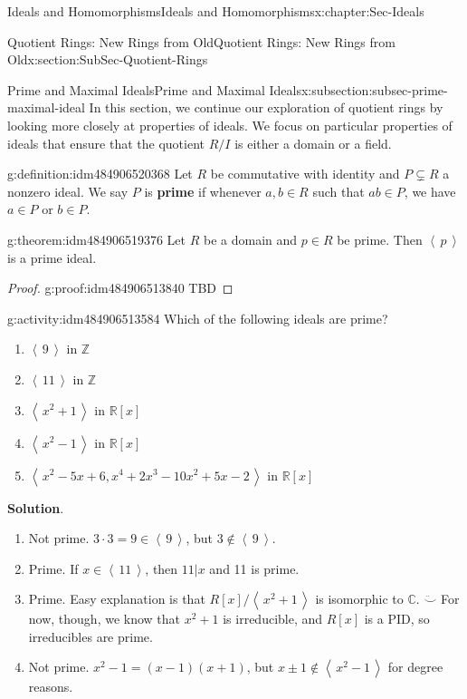 \documentclass[oneside,10pt,]{book}
\newcommand{\blocktitlefont}{\relax}
\newcommand{\terminology}[1]{\textbf{#1}}
\numberwithin{equation}{section}
\newcommand{\ideal}[1]{\left\langle\, #1 \,\right\rangle}
\def\C{{\mathbb C}}
\def\Z{{\mathbb Z}}
\def\R{{\mathbb R}}
\begin{document}
\begin{chapterptx}{Ideals and Homomorphisms}{}{Ideals and Homomorphisms}{}{}{x:chapter:Sec-Ideals}
\begin{sectionptx}{Quotient Rings: New Rings from Old}{}{Quotient Rings: New Rings from Old}{}{}{x:section:SubSec-Quotient-Rings}
\typeout{************************************************}
%
\begin{subsectionptx}{Prime and Maximal Ideals}{}{Prime and Maximal Ideals}{}{}{x:subsection:subsec-prime-maximal-ideal}
In this section, we continue our exploration of quotient rings by looking more closely at properties of ideals. We focus on particular properties of ideals that ensure that the quotient \(R/I\) is either a domain or a field.%
\begin{definition}{}{g:definition:idm484906520368}%
%
%
Let \(R\) be commutative with identity and \(P\subsetneq R\) a nonzero ideal. We say \(P\) is \terminology{prime} if whenever \(a,b\in R\) such that \(ab\in P\), we have \(a\in P\) or \(b\in P\).%
\end{definition}
\begin{theorem}{}{}{g:theorem:idm484906519376}%
Let \(R\) be a domain and \(p\in R\) be prime. Then \(\ideal{p}\) is a prime ideal.%
\end{theorem}
\begin{proof}{}{g:proof:idm484906513840}
TBD\end{proof}
\begin{activity}{}{g:activity:idm484906513584}%
Which of the following ideals are prime?%
\begin{enumerate}
\item{}\(\ideal{9}\) in \(\Z\)%
\item{}\(\ideal{11}\) in \(\Z\)%
\item{}\(\ideal{x^2+1}\) in \(\R[x]\)%
\item{}\(\ideal{x^2-1}\) in \(\R[x]\)%
\item{}\(\ideal{x^2-5x+6, x^4+2x^3-10x^2+5x-2}\) in \(\R[x]\)%
\end{enumerate}
%
\par\smallskip%
\noindent\textbf{\blocktitlefont Solution}.\hypertarget{g:solution:idm484906480592}{}\quad{}%
\begin{enumerate}
\item{}Not prime. \(3\cdot 3= 9\in \ideal{9}\), but \(3\notin\ideal{9}\).%
\item{}Prime. If \(x\in \ideal{11}\), then \(11|x\) and 11 is prime.%
\item{}Prime. Easy explanation is that \(R[x]/\ideal{x^2+1}\) is isomorphic to \(\C\). \(\ddot\smile\) For now, though, we know that \(x^2+1\) is irreducible, and \(R[x]\) is a PID, so irreducibles are prime.%
\item{}Not prime. \(x^2-1 = (x-1)(x+1)\), but \(x\pm 1\notin \ideal{x^2-1}\) for degree reasons.%

\end{enumerate}
\end{activity}
\end{subsectionptx}
\end{sectionptx}
\end{chapterptx}
\end{document}

